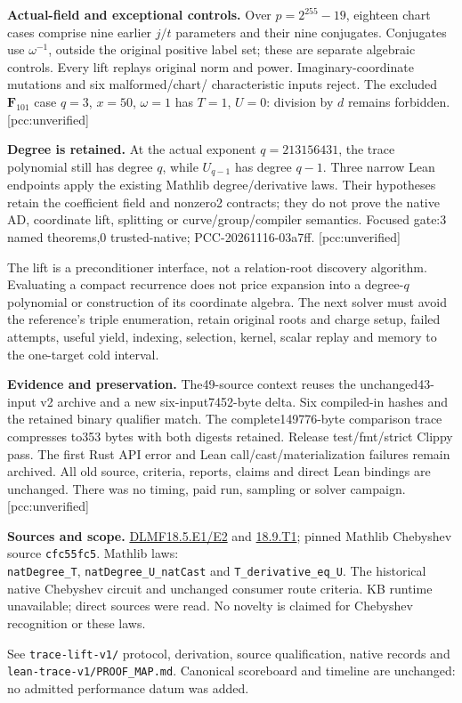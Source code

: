 \documentclass[10pt]{article}
\begin{document}
\textbf{Actual-field and exceptional controls.}
Over $p=2^{255}-19$, eighteen chart cases comprise nine earlier $j/t$ parameters and their
nine conjugates. Conjugates use $\omega^{-1}$, outside the original positive
label set; these are separate algebraic controls. Every lift replays original
norm and power. Imaginary-coordinate mutations and six malformed/chart/
characteristic inputs reject. The excluded $\mathbf F_{101}$ case $q=3$,
$x=50$, $\omega=1$ has $T=1$, $U=0$: division by $d$ remains forbidden.
[pcc:unverified]

\textbf{Degree is retained.}
At the actual exponent $q=213156431$, the trace polynomial still has degree
$q$, while $U_{q-1}$ has degree $q-1$. Three narrow Lean endpoints apply the
existing Mathlib degree/derivative laws. Their hypotheses retain the
coefficient field and nonzero2 contracts; they do not prove the native AD,
coordinate lift, splitting or curve/group/compiler semantics.
Focused gate:3 named theorems,0 trusted-native; PCC-20261116-03a7ff.
[pcc:unverified]

The lift is a preconditioner interface, not a relation-root discovery
algorithm. Evaluating a compact recurrence does not price expansion into a
degree-$q$ polynomial or construction of its coordinate algebra. The next
solver must avoid the reference's triple enumeration, retain original roots
and charge setup, failed attempts, useful yield, indexing, selection,
kernel, scalar replay and memory to the one-target cold interval.

\textbf{Evidence and preservation.}
The49-source context reuses the unchanged43-input v2 archive and a new
six-input7452-byte delta. Six compiled-in hashes and the retained binary
qualifier match. The complete149776-byte comparison trace compresses to353
bytes with both digests retained. Release test/fmt/strict Clippy pass.
The first Rust API error and Lean call/cast/materialization failures remain
archived. All old source, criteria, reports, claims and direct Lean bindings
are unchanged. There was no timing, paid run, sampling or solver campaign.
[pcc:unverified]

\textbf{Sources and scope.}
\href{https://dlmf.nist.gov/18.5}{DLMF18.5.E1/E2} and
\href{https://dlmf.nist.gov/18.9}{18.9.T1}; pinned Mathlib Chebyshev source
\texttt{cfc55fc5}. Mathlib laws:\\
\texttt{natDegree\_T}, \texttt{natDegree\_U\_natCast} and
\texttt{T\_derivative\_eq\_U}. The historical native Chebyshev circuit
and unchanged consumer route criteria. KB runtime unavailable; direct sources
were read. No novelty is claimed for Chebyshev recognition or these laws.

See \texttt{trace-lift-v1/} protocol, derivation, source qualification,
native records and \texttt{lean-trace-v1/PROOF\_MAP.md}. Canonical scoreboard
and timeline are unchanged: no admitted performance datum was added.
\end{document}

